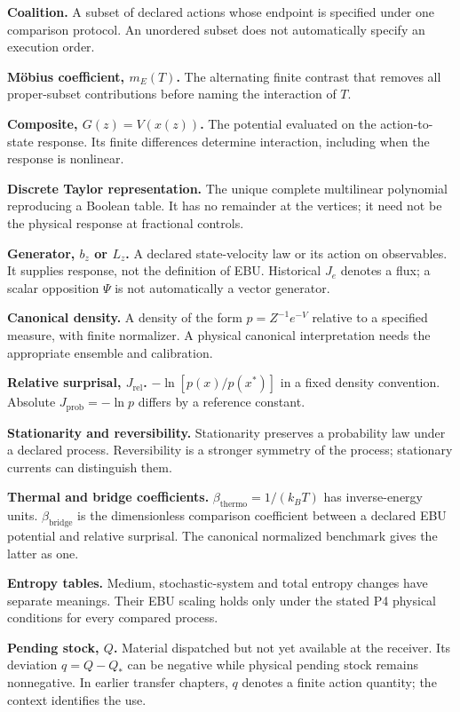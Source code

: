 \textbf{Coalition.} A subset of declared actions whose endpoint is specified under one comparison protocol. An unordered subset does not automatically specify an execution order.

\textbf{M\"obius coefficient, $m_E(T)$.} The alternating finite contrast that removes all proper-subset contributions before naming the interaction of $T$.

\textbf{Composite, $G(z)=V(x(z))$.} The potential evaluated on the action-to-state response. Its finite differences determine interaction, including when the response is nonlinear.

\textbf{Discrete Taylor representation.} The unique complete multilinear polynomial reproducing a Boolean table. It has no remainder at the vertices; it need not be the physical response at fractional controls.

\textbf{Generator, $b_z$ or $L_z$.} A declared state-velocity law or its action on observables. It supplies response, not the definition of EBU. Historical $J_e$ denotes a flux; a scalar opposition $\Psi$ is not automatically a vector generator.

\textbf{Canonical density.} A density of the form $p=Z^{-1}e^{-V}$ relative to a specified measure, with finite normalizer. A physical canonical interpretation needs the appropriate ensemble and calibration.

\textbf{Relative surprisal, $J_{\mathrm{rel}}$.} $-\ln[p(x)/p(x^*)]$ in a fixed density convention. Absolute $J_{\mathrm{prob}}=-\ln p$ differs by a reference constant.

\textbf{Stationarity and reversibility.} Stationarity preserves a probability law under a declared process. Reversibility is a stronger symmetry of the process; stationary currents can distinguish them.

\textbf{Thermal and bridge coefficients.} $\beta_{\mathrm{thermo}}=1/(k_BT)$ has inverse-energy units. $\beta_{\mathrm{bridge}}$ is the dimensionless comparison coefficient between a declared EBU potential and relative surprisal. The canonical normalized benchmark gives the latter as one.

\textbf{Entropy tables.} Medium, stochastic-system and total entropy changes have separate meanings. Their EBU scaling holds only under the stated P4 physical conditions for every compared process.

\textbf{Pending stock, $Q$.} Material dispatched but not yet available at the receiver. Its deviation $q=Q-Q_*$ can be negative while physical pending stock remains nonnegative. In earlier transfer chapters, $q$ denotes a finite action quantity; the context identifies the use.

